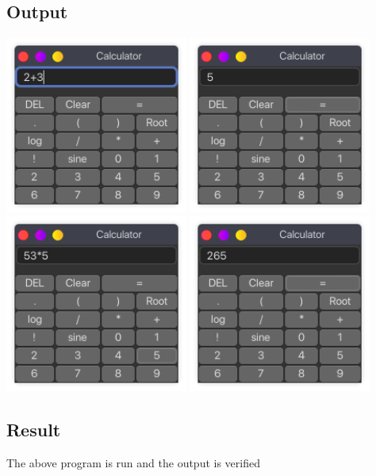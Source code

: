 \documentclass{article}
\begin{document}
\subsection{Output}
\includegraphics[width=0.45\textwidth]{img/p24/ss1.png}
\includegraphics[width=0.45\textwidth]{img/p24/ss2.png}\newline
\includegraphics[width=0.45\textwidth]{img/p24/ss3.png}
\includegraphics[width=0.45\textwidth]{img/p24/ss4.png}\newline

\subsection{Result}
The above program is run and the output is verified
\end{document}
